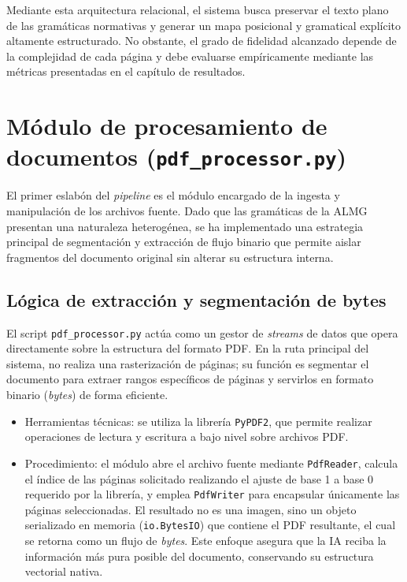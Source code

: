 Mediante esta arquitectura relacional, el sistema busca preservar el texto plano de las gramáticas normativas y generar un mapa posicional y gramatical explícito altamente estructurado. No obstante, el grado de fidelidad alcanzado depende de la complejidad de cada página y debe evaluarse empíricamente mediante las métricas presentadas en el capítulo de resultados.



\section{Módulo de procesamiento de documentos (\texttt{pdf\_processor.py})}

El primer eslabón del \textit{pipeline} es el módulo encargado de la ingesta y manipulación de los archivos fuente. Dado que las gramáticas de la ALMG presentan una naturaleza heterogénea, se ha implementado una estrategia principal de segmentación y extracción de flujo binario que permite aislar fragmentos del documento original sin alterar su estructura interna.

\subsection{Lógica de extracción y segmentación de bytes}

El script \texttt{pdf\_processor.py} actúa como un gestor de \textit{streams} de datos que opera directamente sobre la estructura del formato PDF. En la ruta principal del sistema, no realiza una rasterización de páginas; su función es segmentar el documento para extraer rangos específicos de páginas y servirlos en formato binario (\textit{bytes}) de forma eficiente.

\begin{itemize}
    \item Herramientas técnicas: se utiliza la librería \texttt{PyPDF2}, que permite realizar operaciones de lectura y escritura a bajo nivel sobre archivos PDF.

    \item Procedimiento: el módulo abre el archivo fuente mediante \texttt{PdfReader}, calcula el índice de las páginas solicitado realizando el ajuste de base 1 a base 0 requerido por la librería, y emplea \texttt{PdfWriter} para encapsular únicamente las páginas seleccionadas. El resultado no es una imagen, sino un objeto serializado en memoria (\texttt{io.BytesIO}) que contiene el PDF resultante, el cual se retorna como un flujo de \textit{bytes}. Este enfoque asegura que la IA reciba la información más pura posible del documento, conservando su estructura vectorial nativa.
\end{itemize}

